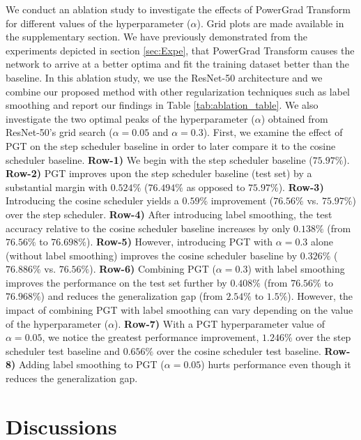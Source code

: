 \documentclass[times,sort&compress]{elsarticle}
\begin{document}
We conduct an ablation study to investigate the effects of PowerGrad Transform for
different values of the hyperparameter ($\alpha$). Grid plots are made available in the
supplementary section. We have previously demonstrated from the experiments depicted in
section \ref{sec:Expe}, that PowerGrad Transform causes the network to arrive at a
better optima and fit the training dataset better than the baseline. In this ablation
study, we use the ResNet-50 architecture and we combine our proposed method with other
regularization techniques such as label smoothing and report our findings in Table
\ref{tab:ablation_table}. We also investigate the two optimal peaks of the
hyperparameter ($\alpha$) obtained from ResNet-50's grid search ($\alpha=0.05$ and
$\alpha=0.3$). First, we examine the effect of PGT on the step scheduler baseline in
order to later compare it to the cosine scheduler baseline. \textbf{Row-1)} We begin
with the step scheduler baseline ($75.97\%$). \textbf{Row-2)} PGT improves upon the step
scheduler baseline (test set) by a substantial margin with $0.524\%$ ($76.494\%$ as
opposed to $75.97\%$). \textbf{Row-3)} Introducing the cosine scheduler yields a
$0.59\%$ improvement ($76.56\%$ vs. $75.97\%$) over the step scheduler. \textbf{Row-4)}
After introducing label smoothing, the test accuracy relative to the cosine scheduler
baseline increases by only $0.138\%$ (from $76.56\%$ to $76.698\%$). \textbf{Row-5)}
However, introducing PGT with $\alpha=0.3$ alone (without label smoothing) improves the
cosine scheduler baseline by $0.326\%$ ($76.886\%$ vs. $76.56\%$). \textbf{Row-6)}
Combining PGT ($\alpha=0.3$) with label smoothing improves the performance on the test
set further by $0.408\%$ (from $76.56\%$ to $76.968\%$) and reduces the generalization
gap (from $2.54\%$ to $1.5\%$). However, the impact of combining PGT with label
smoothing can vary depending on the value of the hyperparameter ($\alpha$).
\textbf{Row-7)} With a PGT hyperparameter value of $\alpha=0.05$, we notice the greatest
performance improvement, $1.246\%$ over the step scheduler test baseline and $0.656\%$
over the cosine scheduler test baseline. \textbf{Row-8)} Adding label smoothing to PGT
($\alpha=0.05$) hurts performance even though it reduces the generalization gap.





\section{Discussions}
\label{sec:Disc}
\end{document}
